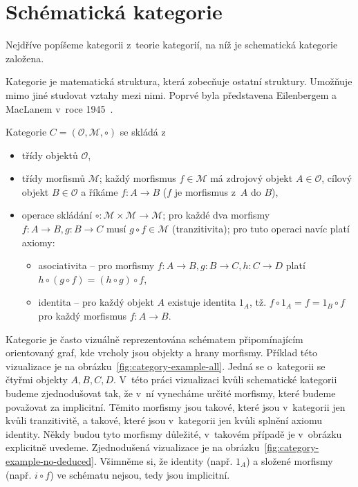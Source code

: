 \section{Schématická kategorie}

Nejdříve popíšeme kategorii z~teorie kategorií, na níž je schematická kategorie založena.

Kategorie je matematická struktura, která zobecňuje ostatní struktury.
Umožňuje mimo jiné studovat vztahy mezi nimi.
Poprvé byla představena Eilenbergem a MacLanem v~roce 1945~\cite{eilenberg_1945}.

Kategorie $C=(\mathcal O, \mathcal M, \circ)$ se skládá
z~\begin{itemize}
  \item třídy objektů $\mathcal O$,
  \item třídy morfismů $\mathcal M$; každý morfismus $f \in \mathcal M$ má zdrojový objekt $A\in\mathcal O$, cílový objekt $B\in\mathcal O$ a říkáme $f: A\to B$ ($f$ je morfismus z~$A$ do $B$),
  \item operace skládání $\circ\colon \mathcal M\times\mathcal M \to \mathcal M$; pro každé dva morfismy $f\colon A\to B, g\colon B\to C$ musí $g\circ f\in \mathcal M$ (tranzitivita); pro tuto operaci navíc platí axiomy:
        \begin{itemize}
          \item asociativita -- pro morfismy $f\colon A\to B, g\colon B\to C, h\colon C\to D$ platí $h\circ (g \circ f) = (h\circ g)\circ f$,
          \item identita -- pro každý objekt $A$ existuje identita $1_A$, tž. $f\circ 1_A = f = 1_B\circ f$ pro každý morfismus $f: A\to B$.
        \end{itemize}
\end{itemize}

Kategorie je často vizuálně reprezentována schématem připomínajícím orientovaný graf, kde vrcholy jsou objekty a hrany morfismy.
Příklad této vizualizace je na obrázku~\ref{fig:category-example-all}.
Jedná se o~kategorii se čtyřmi objekty $A, B, C, D$.
V~této práci vizualizaci kvůli schematické kategorii budeme zjednodušovat tak, že v~ní vynecháme určité morfismy, které budeme považovat za implicitní.
Těmito morfismy jsou takové, které jsou v~kategorii jen kvůli tranzitivitě, a takové, které jsou v~kategorii jen kvůli splnění axiomu identity.
Někdy budou tyto morfismy důležité, v~takovém případě je v~obrázku explicitně uvedeme.
Zjednodušená vizualizace je na obrázku~\ref{fig:category-example-no-deduced}.
Všimněme si, že identity (např. $1_A$) a složené morfismy (např. $i\circ f$) ve schématu nejsou, tedy jsou implicitní.

